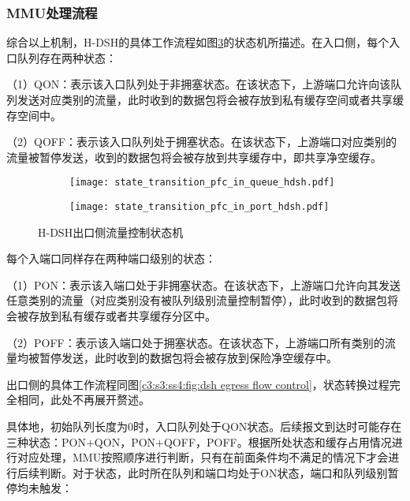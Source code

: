 
\subsubsection{MMU处理流程}

综合以上机制，H-DSH的具体工作流程如图\ref{c4:s3:ss4:fig:hdsh ingress flow control}的状态机所描述。在入口侧，每个入口队列存在两种状态：

（1）QON：表示该入口队列处于非拥塞状态。在该状态下，上游端口允许向该队列发送对应类别的流量，此时收到的数据包将会被存放到私有缓存空间或者共享缓存空间中。

（2）QOFF：表示该入口队列处于拥塞状态。在该状态下，上游端口对应类别的流量被暂停发送，收到的数据包将会被存放到共享缓存中，即共享净空缓存。

\begin{figure}[H]
  \begin{subfigure}[b]{0.49\linewidth}
      \centering
      \texttt{[image: state\_transition\_pfc\_in\_queue\_hdsh.pdf]}
      \label{c4:s3:ss4:fig:sub1h:dsh ingress queue state transition}
  \end{subfigure}
  \begin{subfigure}[b]{0.49\linewidth}
      \centering
      \texttt{[image: state\_transition\_pfc\_in\_port\_hdsh.pdf]}
      \label{c4:s3:ss4:fig:sub2:hdsh ingress port state transition}
  \end{subfigure}
  \caption{H-DSH出口侧流量控制状态机}
  \label{c4:s3:ss4:fig:hdsh ingress flow control}
\end{figure}

每个入端口同样存在两种端口级别的状态：

\setcounter{paragraph}{0}
（1）PON：表示该入端口处于非拥塞状态。在该状态下，上游端口允许向其发送任意类别的流量（对应类别没有被队列级别流量控制暂停），此时收到的数据包将会被存放到私有缓存或者共享缓存分区中。

（2）POFF：表示该入端口处于拥塞状态。在该状态下，上游端口所有类别的流量均被暂停发送，此时收到的数据包将会被存放到保险净空缓存中。

出口侧的具体工作流程同图\ref{c3:s3:ss4:fig:dsh egress flow control}，状态转换过程完全相同，此处不再展开赘述。

具体地，初始队列长度为0时，入口队列处于QON状态。后续报文到达时可能存在三种状态：PON$+$QON，PON$+$QOFF，POFF。根据所处状态和缓存占用情况进行对应处理，MMU按照顺序进行判断，只有在前面条件均不满足的情况下才会进行后续判断。对于状态，此时所在队列和端口均处于ON状态，端口和队列级别暂停均未触发：

